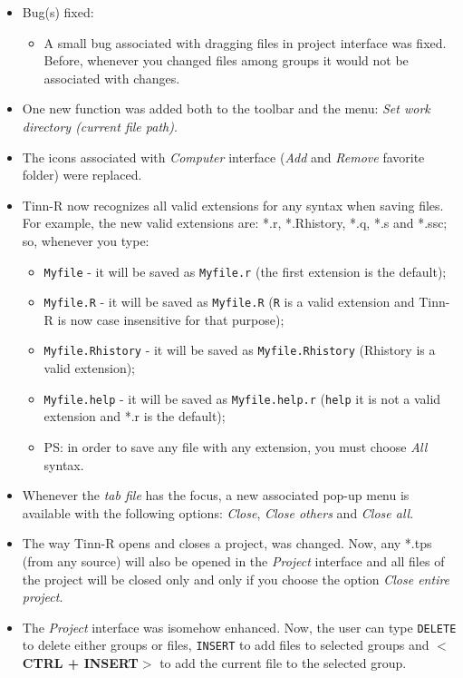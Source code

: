 \begin{itemize}
  \item Bug(s) fixed:
    \begin{itemize}
      \item A small bug associated with dragging files in project interface
        was fixed. Before, whenever you changed files among groups it
        would not be associated with changes.
    \end{itemize}
  \item One new function was added both to the \RR{} toolbar and the \RR{}
    menu: \textit{Set work directory (current file path)}.
  \item The icons associated with \textit{Computer} interface (\textit{Add}
    and \textit{Remove} favorite folder) were replaced.
  \item Tinn-R now recognizes all valid extensions for any syntax when
    saving files. For example, the new valid \RR{} extensions are: *.r,
    *.Rhistory, *.q, *.s and *.ssc; so, whenever you type:
    \begin{itemize}
      \item \texttt{Myfile} - it will be saved as \texttt{Myfile.r} (the
        first extension is the default);
      \item \texttt{Myfile.R} - it will be saved as \texttt{Myfile.R}
        (\texttt{R} is a valid extension and Tinn-R is now case insensitive
        for that purpose);
      \item \texttt{Myfile.Rhistory} - it will be saved as
        \texttt{Myfile.Rhistory} (Rhistory is a valid extension);
      \item \texttt{Myfile.help} - it will be saved as \texttt{Myfile.help.r}
        (\texttt{help} it is not a valid extension and *.r is the default);
      \item PS: in order to save any file with any extension, you must choose
        \textit{All} syntax.
    \end{itemize}
  \item Whenever the \textit{tab file} has the focus, a new associated
    pop-up menu is available with the following options: \textit{Close},
    \textit{Close others} and \textit{Close all}.
  \item The way Tinn-R opens and closes a project, was changed. Now, any *.tps
    (from any source) will also be opened in the \textit{Project} interface
    and all files of the project will be closed only and only if you choose
    the option \textit{Close entire project}.
  \item The \textit{Project} interface was isomehow enhanced. Now, the user
    can type \texttt{DELETE} to delete either groups or files, \texttt{INSERT}
    to add files to selected groups and $<$\textbf{CTRL + INSERT}$>$ to add
    the current file to the selected group.
\end{itemize}


